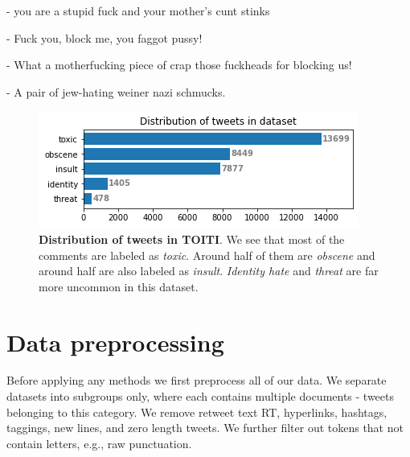 \documentclass[fleqn,moreauthors,10pt]{ds_report}
\newcommand\bm{0.2pt}
\begin{document}
\begin{tcolorbox}[width=0.9\linewidth, center,arc=8pt,sharp corners=downhill, boxrule=0.3pt, left=\bm, top=\bm, right=\bm, bottom=\bm, fontupper=\small]
 - you are a stupid fuck and your mother's cunt stinks
\end{tcolorbox}

\begin{tcolorbox}[width=0.9\linewidth, center,arc=8pt,sharp corners=downhill, boxrule=0.3pt, left=\bm, top=\bm, right=\bm, bottom=\bm, fontupper=\small]
 - Fuck you, block me, you faggot pussy!
\end{tcolorbox}

\begin{tcolorbox}[width=0.9\linewidth, center,arc=8pt,sharp corners=downhill, boxrule=0.3pt, left=\bm, top=\bm, right=\bm, bottom=\bm, fontupper=\small]
 - What a motherfucking piece of crap those fuckheads for blocking us!
\end{tcolorbox}

\begin{tcolorbox}[width=0.9\linewidth, center,arc=8pt,sharp corners=downhill, boxrule=0.3pt, left=\bm, top=\bm, right=\bm, bottom=\bm, fontupper=\small]
 - A pair of jew-hating weiner nazi schmucks.
\end{tcolorbox}


\begin{figure}
	\includegraphics[width=\linewidth]{distribution_wiki_dataset.png}
	\caption{\textbf{Distribution of tweets in TOITI}. We see that most of the comments are labeled as \textit{toxic}. Around half of them are \textit{obscene} and around half are also labeled as \textit{insult}. \textit{Identity hate} and \textit{threat} are far more uncommon in this dataset.}
	\label{fig:distribution_wiki_dataset}
\end{figure}

\section*{Data preprocessing}
Before applying any methods we first preprocess all of our data. We separate datasets into subgroups only, where each contains multiple documents - tweets belonging to this category. We remove retweet text RT, hyperlinks, hashtags, taggings, new lines, and zero length tweets. We further filter out tokens that not contain letters, e.g., raw punctuation.
\end{document}
